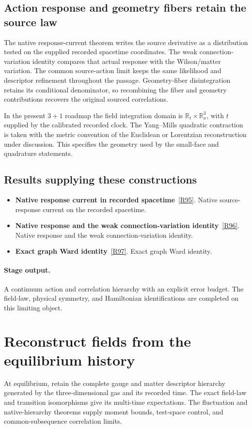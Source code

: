 \documentclass[11pt,a4paper]{article}
\begin{document}
\subsection*{Action response and geometry fibers retain the source law}
The native response-current theorem writes the source derivative as a distribution tested on the supplied recorded spacetime coordinates. The weak connection-variation identity compares that actual response with the Wilson/matter variation. The common source-action limit keeps the same likelihood and descriptor refinement throughout the passage. Geometry-fiber disintegration retains its conditional denominator, so recombining the fiber and geometry contributions recovers the original sourced correlations.

In the present \(3+1\) roadmap the field integration domain is \(\mathbb R_t\times\mathbb R_x^3\), with \(t\) supplied by the calibrated recorded clock. The Yang--Mills quadratic contraction is taken with the metric convention of the Euclidean or Lorentzian reconstruction under discussion. This specifies the geometry used by the small-face and quadrature statements.
\subsection*{Results supplying these constructions}
\begin{itemize}
\item \textbf{Native response current in recorded spacetime}~\hyperref[src:thm-ym-native-response-current]{[R95]}. Native source-response current on the recorded spacetime.
\item \textbf{Native response and the weak connection-variation identity}~\hyperref[src:prop-ym-native-connection-variation-identity]{[R96]}. Native response and the weak connection-variation identity.
\item \textbf{Exact graph Ward identity}~\hyperref[src:lem-ym-discrete-ward]{[R97]}. Exact graph Ward identity.
\end{itemize}
\paragraph{Stage output.} A continuum action and correlation hierarchy with an explicit error budget. The field-law, physical symmetry, and Hamiltonian identifications are completed on this limiting object.

\section{Reconstruct fields from the equilibrium history}
\label{stage:17}
At equilibrium, retain the complete gauge and matter descriptor hierarchy generated by the three-dimensional gas and its recorded time. The exact field-law and transition isomorphisms give its multi-time expectations. The fluctuation and native-hierarchy theorems supply moment bounds, test-space control, and common-subsequence correlation limits.
\end{document}
